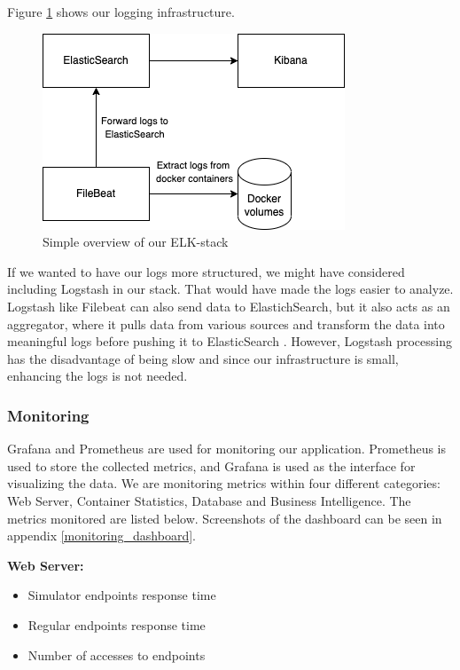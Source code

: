 \documentclass{article}
\newcommand{\imagewidth}{16cm}
\begin{document}
Figure \ref{fig:log-stack} shows our logging infrastructure.

\begin{figure}[H]
   \centering
   \includegraphics[width=\imagewidth/2]{Logging.drawio.png}
   \caption{Simple overview of our ELK-stack}
   \label{fig:log-stack}
\end{figure}

If we wanted to have our logs more structured, we might have considered including Logstash in our stack. That would have made the logs easier to analyze. Logstash like Filebeat can also send data to ElastichSearch, but it also acts as an aggregator, where it pulls data from various sources and transform the data into meaningful logs before pushing it to ElasticSearch \cite{filebeat-vs-logstash}. However, Logstash processing has the disadvantage of being slow and since our infrastructure is small, enhancing the logs is not needed. 

\subsubsection{Monitoring}
Grafana and Prometheus are used for monitoring our application. Prometheus is used to store the collected metrics, and Grafana is used as the interface for visualizing the data. We are monitoring metrics within four different categories: Web Server, Container Statistics, Database and Business Intelligence. The metrics monitored are listed below. Screenshots of the dashboard can be seen in appendix \ref{monitoring_dashboard}.

\textbf{Web Server:}
\begin{itemize}
    \item Simulator endpoints response time
    \item Regular endpoints response time
    \item Number of accesses to endpoints
\end{itemize}
\end{document}
